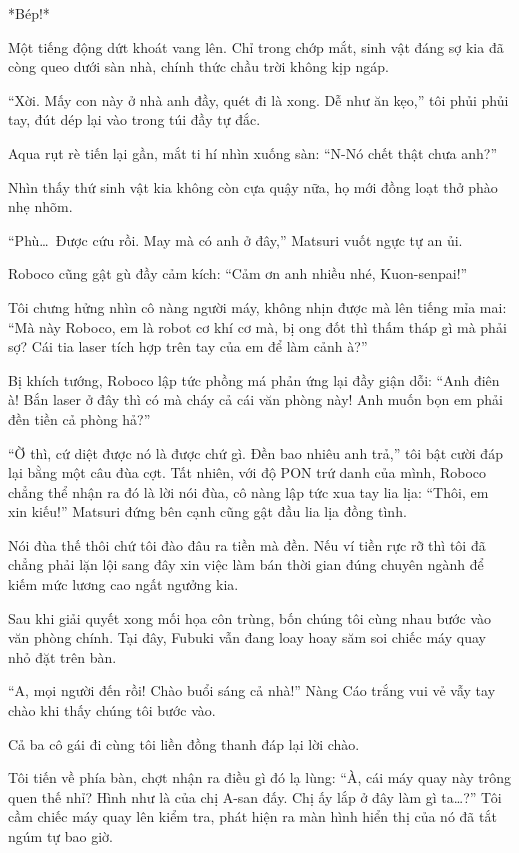 \documentclass[../main.tex]{subfiles}
\begin{document}
*Bép!*

Một tiếng động dứt khoát vang lên. Chỉ trong chớp mắt, sinh vật đáng sợ kia đã còng queo dưới sàn nhà, chính thức chầu trời không kịp ngáp.

``Xời. Mấy con này ở nhà anh đầy, quét đi là xong. Dễ như ăn kẹo,'' tôi phủi phủi tay, đút dép lại vào trong túi đầy tự đắc.

Aqua rụt rè tiến lại gần, mắt ti hí nhìn xuống sàn: ``N-Nó chết thật chưa anh?''

Nhìn thấy thứ sinh vật kia không còn cựa quậy nữa, họ mới đồng loạt thở phào nhẹ nhõm.

``Phù\dots\ Được cứu rồi. May mà có anh ở đây,'' Matsuri vuốt ngực tự an ủi.

Roboco cũng gật gù đầy cảm kích: ``Cảm ơn anh nhiều nhé, Kuon-senpai!''

Tôi chưng hửng nhìn cô nàng người máy, không nhịn được mà lên tiếng mỉa mai: ``Mà này Roboco, em là robot cơ khí cơ mà, bị ong đốt thì thấm tháp gì mà phải sợ? Cái tia laser tích hợp trên tay của em để làm cảnh à?''

Bị khích tướng, Roboco lập tức phồng má phản ứng lại đầy giận dỗi: ``Anh điên à! Bắn laser ở đây thì có mà cháy cả cái văn phòng này! Anh muốn bọn em phải đền tiền cả phòng hả?''

``Ờ thì, cứ diệt được nó là được chứ gì. Đền bao nhiêu anh trả,'' tôi bật cười đáp lại bằng một câu đùa cợt. Tất nhiên, với độ PON trứ danh của mình, Roboco chẳng thể nhận ra đó là lời nói đùa, cô nàng lập tức xua tay lia lịa: ``Thôi, em xin kiếu!'' Matsuri đứng bên cạnh cũng gật đầu lia lịa đồng tình.

Nói đùa thế thôi chứ tôi đào đâu ra tiền mà đền. Nếu ví tiền rực rỡ thì tôi đã chẳng phải lặn lội sang đây xin việc làm bán thời gian đúng chuyên ngành để kiếm mức lương cao ngất ngưởng kia.

Sau khi giải quyết xong mối họa côn trùng, bốn chúng tôi cùng nhau bước vào văn phòng chính. Tại đây, Fubuki vẫn đang loay hoay săm soi chiếc máy quay nhỏ đặt trên bàn.

``A, mọi người đến rồi! Chào buổi sáng cả nhà!'' Nàng Cáo trắng vui vẻ vẫy tay chào khi thấy chúng tôi bước vào.

Cả ba cô gái đi cùng tôi liền đồng thanh đáp lại lời chào.

Tôi tiến về phía bàn, chợt nhận ra điều gì đó lạ lùng: ``À, cái máy quay này trông quen thế nhỉ? Hình như là của chị A-san đấy. Chị ấy lắp ở đây làm gì ta\dots?'' Tôi cầm chiếc máy quay lên kiểm tra, phát hiện ra màn hình hiển thị của nó đã tắt ngúm tự bao giờ.
\end{document}
